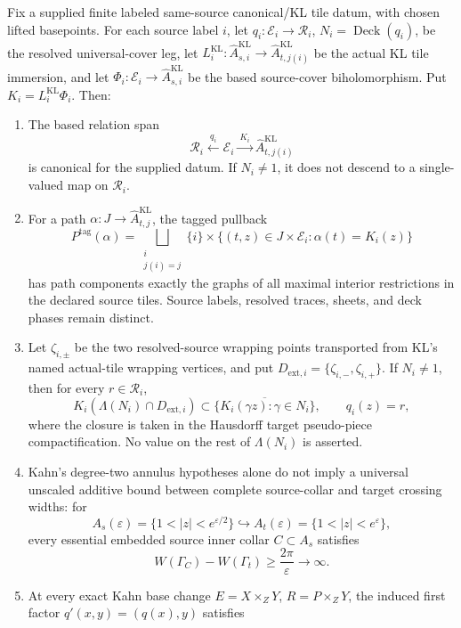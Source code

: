 \begin{proposition}\label{prop:restricted-interface}
Fix a supplied finite labeled same-source canonical/KL tile datum, with chosen lifted basepoints. For each source label \(i\), let \(q_i:\mathcal E_i\to\mathcal R_i\), \(N_i=\operatorname{Deck}(q_i)\), be the resolved universal-cover leg, let \(L^{\mathrm{KL}}_i:\hat A^{\mathrm{KL}}_{s,i}\to\hat A^{\mathrm{KL}}_{t,j(i)}\) be the actual KL tile immersion, and let \(\Phi_i:\mathcal E_i\to\hat A^{\mathrm{KL}}_{s,i}\) be the based source-cover biholomorphism. Put \(K_i=L^{\mathrm{KL}}_i\Phi_i\). Then:
\begin{enumerate}
\item The based relation span
\[
\mathcal R_i\xleftarrow{\ q_i\ }\mathcal E_i\xrightarrow{\ K_i\ }\hat A^{\mathrm{KL}}_{t,j(i)} \tag{10.57}
\]
is canonical for the supplied datum. If \(N_i\neq 1\), it does not descend to a single-valued map on \(\mathcal R_i\).
\item For a path \(\alpha:J\to\hat A^{\mathrm{KL}}_{t,j}\), the tagged pullback
\[
P^{\mathrm{tag}}(\alpha)=\bigsqcup_{\substack{i\\ j(i)=j}}\{i\}\times\{(t,z)\in J\times\mathcal E_i:\alpha(t)=K_i(z)\} \tag{10.58}
\]
has path components exactly the graphs of all maximal interior restrictions in the declared source tiles. Source labels, resolved traces, sheets, and deck phases remain distinct.
\item Let \(\zeta_{i,\pm}\) be the two resolved-source wrapping points transported from KL's named actual-tile wrapping vertices, and put \(D_{\mathrm{ext},i}=\{\zeta_{i,-},\zeta_{i,+}\}\). If \(N_i\neq 1\), then for every \(r\in\mathcal R_i\),
\[
K_i(\Lambda(N_i)\cap D_{\mathrm{ext},i})\subset\overline{\{K_i(\gamma z):\gamma\in N_i\}},\qquad q_i(z)=r, \tag{10.59}
\]
where the closure is taken in the Hausdorff target pseudo-piece compactification. No value on the rest of \(\Lambda(N_i)\) is asserted.
\item Kahn's degree-two annulus hypotheses alone do not imply a universal unscaled additive bound between complete source-collar and target crossing widths: for
\[
A_s(\varepsilon)=\{1<|z|<e^{\varepsilon/2}\}\hookrightarrow A_t(\varepsilon)=\{1<|z|<e^{\varepsilon}\},
\]
every essential embedded source inner collar \(C\subset A_s\) satisfies
\[
W(\Gamma_C)-W(\Gamma_t)\ge\frac{2\pi}{\varepsilon}\longrightarrow\infty. \tag{10.60}
\]
\item At every exact Kahn base change \(E=X\times_Z Y\), \(R=P\times_Z Y\), the induced first factor \(q'(x,y)=(q(x),y)\) satisfies

\end{enumerate}
\end{proposition}
